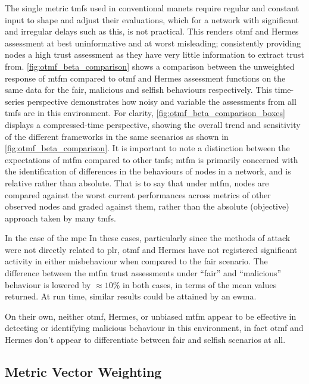 The single metric \glspl{tmf} used in conventional \gls{manet}s require regular and constant input to shape and adjust their evaluations, which for a network with significant and irregular delays such as this, is not practical.
This renders \gls{otmf} and Hermes assessment at best uninformative and at worst misleading; consistently providing nodes a high trust assessment as they have very little information to extract trust from. 
\autoref{fig:otmf_beta_comparison} shows a comparison between the unweighted response of \gls{mtfm} compared to \gls{otmf} and Hermes assessment functions on the same data for the fair, malicious and selfish behaviours respectively.
This time-series perspective demonstrates how noisy and variable the assessments from all \glspl{tmf} are in this environment.
For clarity, \autoref{fig:otmf_beta_comparison_boxes} displays a compressed-time perspective, showing the overall trend and sensitivity of the different frameworks in the same scenarios as shown in \autoref{fig:otmf_beta_comparison}.
It is important to note a distinction between the expectations of \gls{mtfm} compared to other \glspl{tmf}; \gls{mtfm} is primarily concerned with the identification of differences in the behaviours of nodes in a network, and is relative rather than absolute.
That is to say that under \gls{mtfm}, nodes are compared against the worst current performances across metrics of other observed nodes and graded against them, rather than the absolute (objective) approach taken by many \glspl{tmf}.

In the case of the \gls{mpc}
In these cases, particularly since the methods of attack were not directly related to \gls{plr}, \gls{otmf} and Hermes have not registered significant activity in either misbehaviour when compared to the fair scenario.
The difference between the \gls{mtfm} trust assessments under ``fair'' and ``malicious'' behaviour is lowered by $\approx 10\%$ in both cases, in terms of the mean values returned.
At run time, similar results could be attained by an \gls{ewma}.

On their own, neither \gls{otmf}, Hermes, or unbiased \gls{mtfm} appear to be effective in detecting or identifying malicious behaviour in this environment, in fact \gls{otmf} and Hermes don't appear to differentiate between fair and selfish scenarios at all.



\subsection{Metric Vector Weighting}\label{sec:metric_weighting}
%


